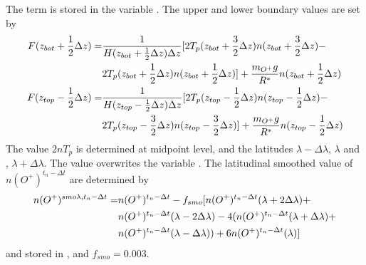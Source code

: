%
The term is stored in the variable . The upper and lower
boundary values are set by
%
\begin{align}
 F(z_{bot}+\frac{1}{2}\Delta z) = & \frac{1}{ H(z_{bot}+\frac{1}{2}\Delta z) \Delta z} [2 T_p(z_{bot}+\frac{3}{2}\Delta
 z)n(z_{bot}+\frac{3}{2}\Delta z) - \\
 {} & 2 T_p(z_{bot}+\frac{1}{2}\Delta z)n(z_{bot}+\frac{1}{2}\Delta z)
 ] + \frac{m_{O^+}  g}{R^*}  n(z_{bot}+\frac{1}{2}\Delta z) \notag \\
%
 F(z_{top}-\frac{1}{2}\Delta z) = & \frac{1}{ H(z_{top}-\frac{1}{2}\Delta z) \Delta z} [2 T_p(z_{top}-\frac{1}{2}\Delta
 z)n(z_{top}-\frac{1}{2}\Delta z) -  \\
 {}& 2 T_p(z_{top}-\frac{3}{2}\Delta z)n(z_{top}-\frac{3}{2}\Delta z)
 ] + \frac{m_{O^+}  g}{R^*}  n(z_{top}-\frac{1}{2}\Delta z) \notag
\end{align}
%
The value $2 n T_p$ is determined at midpoint level, and the
latitudes $\lambda - \Delta \lambda$, $\lambda$ and , $\lambda +
\Delta \lambda$. The value overwrites the variable . The
latitudinal smoothed value of $n(O^+)^{t_n- \Delta t}$ are
determined by
%
\begin{align}
 n(O^+)^{smo\lambda,t_n- \Delta t} = & n(O^+)^{t_n- \Delta t} - f_{smo}[
 n(O^+)^{t_n- \Delta t} (\lambda+ 2 \Delta \lambda) + \notag \\
 {} & n(O^+)^{t_n- \Delta t}(\lambda- 2 \Delta \lambda) - 4 (
 n(O^+)^{t_n- \Delta t}(\lambda+  \Delta \lambda)+ \notag \\
 {} & n(O^+)^{t_n- \Delta t}(\lambda- \Delta \lambda)) + 6n(O^+)^{t_n- \Delta
 t}(\lambda)] \label{eq:oplus_smolat}
\end{align}
%
and stored in , and $f_{smo} = 0.003$. \\

